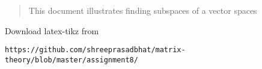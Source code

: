 \documentclass[journal,12pt,twocolumn]{IEEEtran}
\begin{document}
% 
\maketitle
\newpage
\bigskip
\renewcommand{\thefigure}{\theenumi}
\renewcommand{\thetable}{\theenumi}
%
%
\begin{abstract}
This document illustrates finding subspaces of a vector spaces
\end{abstract}
Download latex-tikz from
\begin{lstlisting}
https://github.com/shreeprasadbhat/matrix-theory/blob/master/assignment8/
\end{lstlisting}
%
\end{document}
